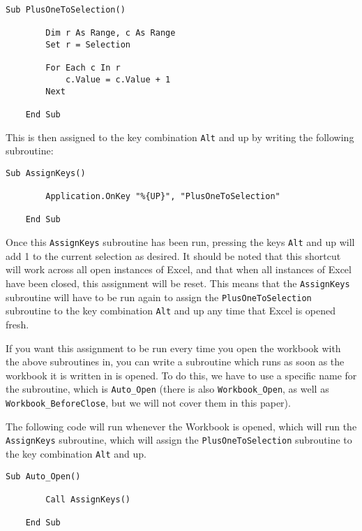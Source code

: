 \documentclass[11pt]{article}%
\begin{document}
\begin{lstlisting}[style=A]
    Sub PlusOneToSelection()

        Dim r As Range, c As Range
        Set r = Selection

        For Each c In r
            c.Value = c.Value + 1
        Next

    End Sub
\end{lstlisting}

This is then assigned to the key combination \texttt{Alt} and up by writing the following subroutine:\\

\begin{lstlisting}[style=A]
    Sub AssignKeys()

        Application.OnKey "%{UP}", "PlusOneToSelection"

    End Sub
\end{lstlisting}

Once this \texttt{AssignKeys} subroutine has been run, pressing the keys \texttt{Alt} and up will add 1 to the current selection as desired. It should be noted that this shortcut will work across all open instances of Excel, and that when all instances of Excel have been closed, this assignment will be reset. This means that the \texttt{AssignKeys} subroutine will have to be run again to assign the \texttt{PlusOneToSelection} subroutine to the key combination \texttt{Alt} and up any time that Excel is opened fresh.

If you want this assignment to be run every time you open the workbook with the above subroutines in, you can write a subroutine which runs as soon as the workbook it is written in is opened. To do this, we have to use a specific name for the subroutine, which is \texttt{Auto\_Open} (there is also \texttt{Workbook\_Open}, as well as \texttt{Workbook\_BeforeClose}, but we will not cover them in this paper).

The following code will run whenever the Workbook is opened, which will run the \texttt{AssignKeys} subroutine, which will assign the \texttt{PlusOneToSelection} subroutine to the key combination \texttt{Alt} and up.\\

\begin{lstlisting}[style=A]
    Sub Auto_Open()

        Call AssignKeys()

    End Sub
\end{lstlisting}
\end{document}

